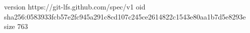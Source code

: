 version https://git-lfs.github.com/spec/v1
oid sha256:0583933fcb57e2fc945a291c8cd107c245ce2614822c1543e80aa1b7d5e8293e
size 763
